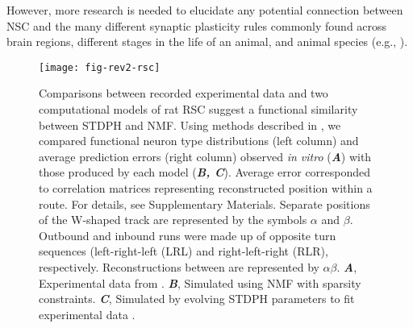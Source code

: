 However, more research is needed to elucidate any potential connection 
between \ac{NSC} and the many different synaptic plasticity rules 
commonly found across brain regions,
different stages in the life of an animal, and animal species
(e.g., \cite{Froemke2010,BCM1982}).
\begin{figure}[h]
	\centering
	\texttt{[image: fig-rev2-rsc]}
    \caption{
    	Comparisons between recorded experimental data and two 
        computational models of rat \ac{RSC} suggest a functional 
        similarity between \ac{STDPH} and \ac{NMF}.
        Using methods described in \cite{AlexanderNitz2015}, 
        we compared functional neuron type distributions (left column)
        and average  prediction errors (right column)
        observed \emph{in vitro} (\textbf{\emph{A}}) with those
        produced by each model (\textbf{\emph{B, C}}).
        Average error corresponded to correlation matrices 
        representing reconstructed position within a route. 
        For details, see Supplementary Materials.
        Separate  positions of the W-shaped track are represented 
        by the symbols $\alpha$ and $\beta$. 
        Outbound and inbound runs were made up of 
        opposite turn sequences (left-right-left (LRL) 
        and right-left-right (RLR), respectively.
        Reconstructions between  are represented by
        $\alpha \beta$. 
	    \textbf{\emph{A}},
    		Experimental data from \cite{AlexanderNitz2015}.
        \textbf{\emph{B}},
            Simulated using NMF with sparsity constraints.
        \textbf{\emph{C}},
            Simulated by evolving \ac{STDPH} parameters 
            to fit experimental data \cite{BeyelerCarlsonChou2015,Carlson2014}.
    }
	\label{fig:NMF|RSC}
\end{figure} 



